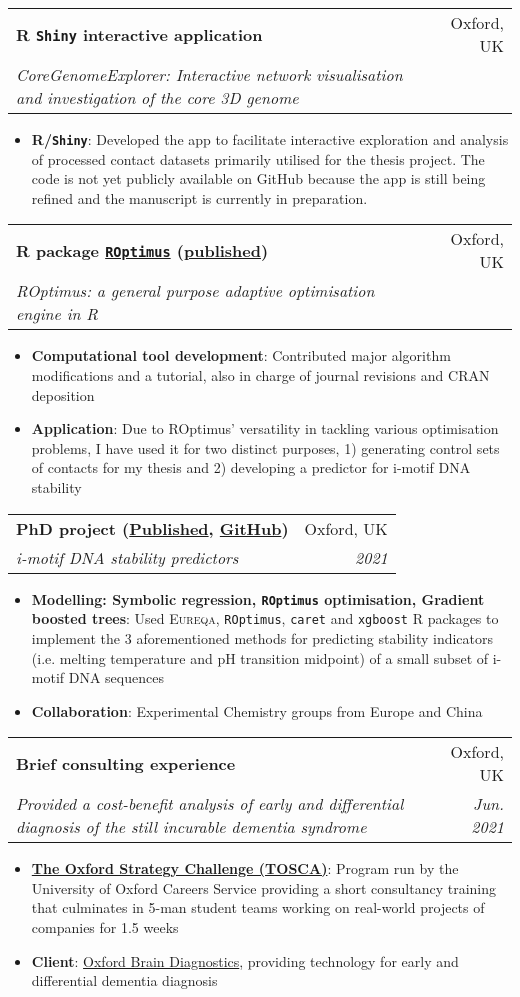 \documentclass[legalpaper,11pt]{article}
\makeatletter
\newcommand{\resumeItem}[2]{
  \item\small{
    \textbf{#1}{: #2 \vspace{-2pt}}
  }
}
\newcommand{\resumeSubheading}[4]{
  \vspace{-1pt}\item
    \begin{tabular*}{0.97\textwidth}[t]{l@{\extracolsep{\fill}}r}
      \textbf{#1} & #2 \\
      \textit{\small#3} & \textit{\small #4} \\
    \end{tabular*}\vspace{-5pt}
}
\newcommand{\resumeItemListStart}{\begin{itemize}}
\newcommand{\resumeItemListEnd}{\end{itemize}\vspace{-5pt}}
\makeatother
\begin{document}
     \resumeSubheading
      {R \texttt{Shiny} interactive application}{Oxford, UK}
      {CoreGenomeExplorer: Interactive network visualisation and investigation of the core 3D genome}{}
      \resumeItemListStart
        \resumeItem{R/\texttt{Shiny}}
          {Developed the app to facilitate interactive exploration and analysis of processed contact datasets primarily utilised for the thesis project. The code is not yet publicly available on GitHub because the app is still being refined and the manuscript is currently in preparation.}
     \resumeItemListEnd

     \resumeSubheading
      {R package \href{https://cran.r-project.org/web/packages/ROptimus/index.html}{\texttt{ROptimus}} (\href{https://doi.org/10.1093/bioinformatics/btad292}{published})}{Oxford, UK}
      {ROptimus: a general purpose adaptive optimisation engine in R}{}
      \resumeItemListStart
        \resumeItem{Computational tool development}
          {Contributed major algorithm modifications and a tutorial, also in charge of journal revisions and CRAN deposition} %
        \resumeItem{Application}{Due to ROptimus' versatility in tackling various optimisation problems, I have used it for two distinct purposes, 1) generating control sets of contacts for my thesis and 2) developing a predictor for i-motif DNA stability}
     \resumeItemListEnd
     
     \resumeSubheading
      {PhD project (\href{https://doi.org/10.1002/anie.202016801}{Published}, \href{https://github.com/SahakyanLab/iMotif_dev}{GitHub})}{Oxford, UK}
      {i-motif DNA stability predictors}{2021}
      \resumeItemListStart
        \resumeItem{Modelling: Symbolic regression, \texttt{ROptimus} optimisation, Gradient boosted trees}
          {Used \textsc{Eureqa}, \texttt{ROptimus}, \texttt{caret} and \texttt{xgboost} R packages to implement the 3 aforementioned methods for predicting stability indicators (i.e. melting temperature and pH transition midpoint) of a small subset of i-motif DNA sequences}
          \resumeItem{Collaboration}{Experimental Chemistry groups from Europe and China}
     \resumeItemListEnd

     \resumeSubheading
      {Brief consulting experience}{Oxford, UK}
      {Provided a cost-benefit analysis of early and differential diagnosis of the still incurable dementia syndrome}{Jun. 2021}
      \resumeItemListStart
        \resumeItem{\href{https://www.careers.ox.ac.uk/oxford-strategy-challenge}{The Oxford Strategy Challenge (TOSCA)}}
          {Program run by the University of Oxford Careers Service providing a short consultancy training that culminates in 5-man student teams working on real-world projects of companies for 1.5 weeks}
        \resumeItem{Client}
          {\href{https://www.oxfordbraindiagnostics.com/}{Oxford Brain Diagnostics}, providing technology for early and differential dementia diagnosis}
      \resumeItemListEnd
     
\end{document}
